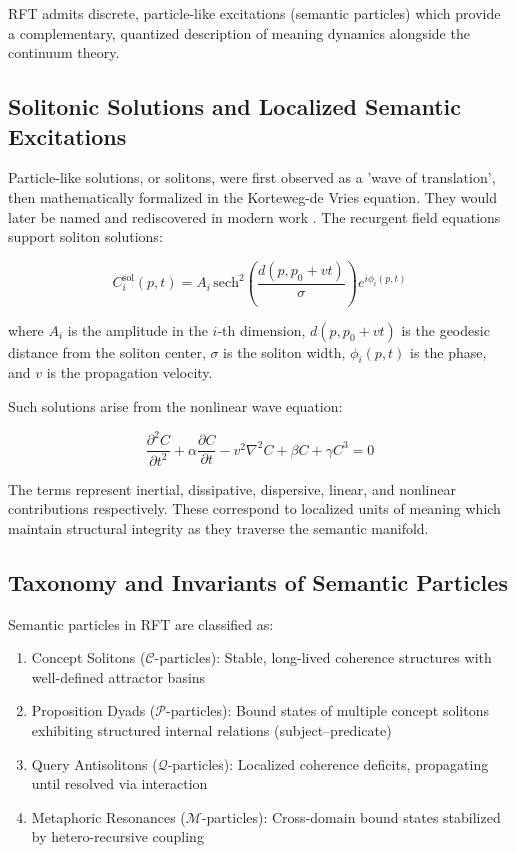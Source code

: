 RFT admits discrete, particle-like excitations (semantic particles) which provide a complementary, quantized description of meaning dynamics alongside the continuum theory.

\subsection{Solitonic Solutions and Localized Semantic Excitations}

Particle-like solutions, or solitons, were first observed as a 'wave of translation', then mathematically formalized in the Korteweg-de Vries equation. They would later be named and rediscovered in modern work \autocite{Russell1845, KortewegdeVries1895, ZabuskyKruskal1965}. The recurgent field equations support soliton solutions:

\begin{equation}
C_i^{\mathrm{sol}}(p, t) = A_i\, \mathrm{sech}^2\left(\frac{d(p, p_0 + vt)}{\sigma}\right) e^{i\phi_i(p, t)}
\end{equation}

where \(A_i\) is the amplitude in the \(i\)-th dimension, \(d(p, p_0 + vt)\) is the geodesic distance from the soliton center, \(\sigma\) is the soliton width, \(\phi_i(p, t)\) is the phase, and \(v\) is the propagation velocity.

Such solutions arise from the nonlinear wave equation:

\begin{equation}
\frac{\partial^2 C}{\partial t^2} + \alpha \frac{\partial C}{\partial t} - v^2 \nabla^2 C + \beta C + \gamma C^3 = 0
\end{equation}

The terms represent inertial, dissipative, dispersive, linear, and nonlinear contributions respectively. These correspond to localized units of meaning which maintain structural integrity as they traverse the semantic manifold.

\subsection{Taxonomy and Invariants of Semantic Particles}

Semantic particles in RFT are classified as:

\begin{enumerate}
    \item Concept Solitons (\(\mathcal{C}\)-particles): Stable, long-lived coherence structures with well-defined attractor basins
    \item Proposition Dyads (\(\mathcal{P}\)-particles): Bound states of multiple concept solitons exhibiting structured internal relations (subject–predicate)
    \item Query Antisolitons (\(\mathcal{Q}\)-particles): Localized coherence deficits, propagating until resolved via interaction
    \item Metaphoric Resonances (\(\mathcal{M}\)-particles): Cross-domain bound states stabilized by hetero-recursive coupling
\end{enumerate}


